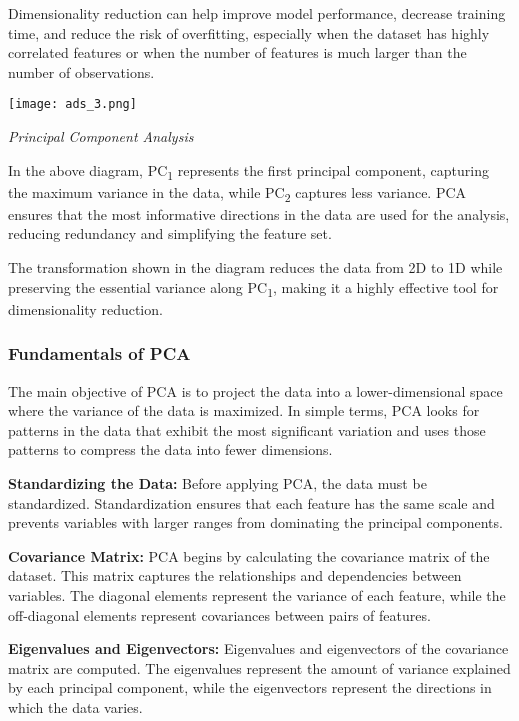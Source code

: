 \documentclass{article}
\begin{document}
Dimensionality reduction can help improve model performance, decrease training time, and reduce the risk of overfitting, especially when the dataset has highly correlated features or when the number of features is much larger than the number of observations.

\begin{center}

\texttt{[image: ads\_3.png]}

\end{center}

\textit{Principal Component Analysis}

In the above diagram, PC\textsubscript{1} represents the first principal component, capturing the maximum variance in the data, while PC\textsubscript{2} captures less variance. PCA ensures that the most informative directions in the data are used for the analysis, reducing redundancy and simplifying the feature set.

The transformation shown in the diagram reduces the data from 2D to 1D while preserving the essential variance along PC\textsubscript{1}, making it a highly effective tool for dimensionality reduction.


\subsubsection{Fundamentals of PCA}
The main objective of PCA is to project the data into a lower-dimensional space where the variance of the data is maximized. In simple terms, PCA looks for patterns in the data that exhibit the most significant variation and uses those patterns to compress the data into fewer dimensions.

\textbf{Standardizing the Data:}
Before applying PCA, the data must be standardized. Standardization ensures that each feature has the same scale and prevents variables with larger ranges from dominating the principal components.

\textbf{Covariance Matrix:}
PCA begins by calculating the covariance matrix of the dataset. This matrix captures the relationships and dependencies between variables. The diagonal elements represent the variance of each feature, while the off-diagonal elements represent covariances between pairs of features.

\textbf{Eigenvalues and Eigenvectors:}
Eigenvalues and eigenvectors of the covariance matrix are computed. The eigenvalues represent the amount of variance explained by each principal component, while the eigenvectors represent the directions in which the data varies.
\end{document}
